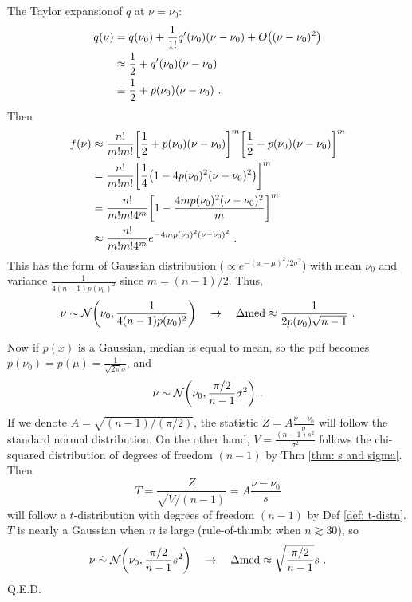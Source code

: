 The Taylor expansionof $ q $ at $ \nu = \nu_0 $:
\begin{equation*}
\begin{aligned}
  q(\nu) &= q(\nu_0) + \frac{1}{1!} q'(\nu_0) (\nu - \nu_0) + O\qty( (\nu - \nu_0)^2 )\\
    &\approx \frac{1}{2} + q'(\nu_0) (\nu - \nu_0) \\
    &\equiv \frac{1}{2} + p(\nu_0) (\nu - \nu_0) ~.
\end{aligned}
\end{equation*}
Then 
\begin{equation*}
\begin{aligned}
  f(\nu) &\approx \frac{n!}{m! m!}
    \qty[ \frac{1}{2} + p(\nu_0) (\nu - \nu_0) ]^m
    \qty[ \frac{1}{2} - p(\nu_0) (\nu - \nu_0) ]^m \\
    &= 
    \frac{n!}{m! m!}
    \qty[ \frac{1}{4} \qty( 1 - 4 p(\nu_0)^2 (\nu - \nu_0 )^2) ]^m \\
    &= 
    \frac{n!}{m! m! 4^m}
    \qty[ 1 - \frac{4 m p(\nu_0)^2 (\nu - \nu_0 )^2}{m} ]^m \\
    &\approx 
    \frac{n!}{m! m! 4^m}
    e^{ -4 m p(\nu_0)^2 (\nu - \nu_0 )^2 } ~.
\end{aligned}
\end{equation*}
This has the form of Gaussian distribution ($ \propto e^{-(x - \mu)^2 / 2\sigma^2} $) with mean $ \nu_0 $ and variance $ \frac{1}{4 (n-1) p(\nu_0)^2} $ since $ m = (n - 1) / 2 $. Thus, 
\begin{equation}
  \nu \sim \mathcal{N} \qty( \nu_0, \frac{1}{4 (n-1) p(\nu_0)^2} )
  \quad\rightarrow \quad
  \Delta \mathrm{med} \approx \frac{1}{2 p(\nu_0) \sqrt{n - 1}} ~.
\end{equation}

Now if $ p(x) $ is a Gaussian, median is equal to mean, so the pdf becomes $ p(\nu_0) = p(\mu) = \frac{1}{\sqrt{2\pi} \sigma} $, and
\begin{equation*}
  \nu \sim \mathcal{N} \qty( \nu_0, \frac{\pi / 2}{n - 1} \sigma^2 ) ~.
\end{equation*}
If we denote $ A = \sqrt{(n - 1) / (\pi / 2)} $, the statistic $ Z = A \frac{\nu - \nu_0}{\sigma} $ will follow the standard normal distribution. On the other hand, $ V = \frac{(n - 1) s^2}{\sigma^2} $ follows the chi-squared distribution of degrees of freedom $ (n - 1) $ by Thm \ref{thm: s and sigma}. Then 
\begin{equation*}
  T = \frac{Z}{\sqrt{V / (n - 1)}}
    = A \frac{\nu - \nu_0}{s}
\end{equation*}
will follow a $ t $-distribution with degrees of freedom $ (n - 1) $ by Def \ref{def: t-distn}. $ T $ is nearly a Gaussian when $ n $ is large (rule-of-thumb: when $ n \gtrsim 30 $), so 
\begin{equation}
  \nu \mathrel{\dot{\sim}} \mathcal{N} \qty( \nu_0, \frac{\pi / 2}{n - 1} s^2 )
  \quad\rightarrow \quad
  \Delta \mathrm{med} \approx \sqrt{\frac{\pi / 2}{n - 1}} s  ~.
\end{equation}
Q.E.D.



